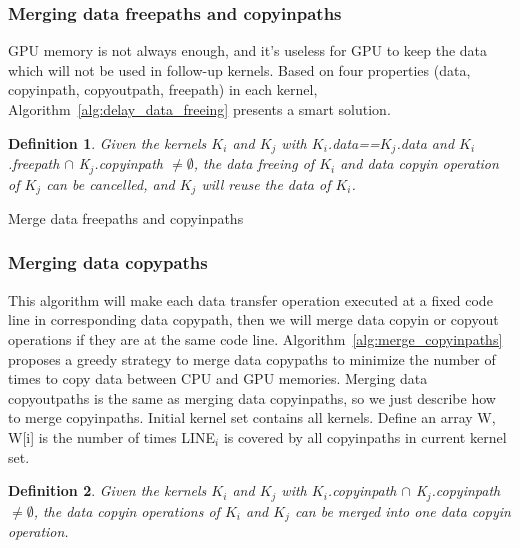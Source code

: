 \documentclass[10pt,conference]{IEEEtran}
\newtheorem{Def1}{Definition}
\begin{document}
\subsubsection{Merging data freepaths and copyinpaths}
GPU memory is not always enough, and it's useless for GPU to keep the data which will not be used in follow-up kernels. Based on four properties (data, copyinpath, copyoutpath, freepath) in each kernel, Algorithm~\ref{alg:delay_data_freeing} presents a smart solution.
\begin{Def1}
Given the kernels $K_i$ and $K_j$ with $K_i$.data==$K_j$.data and $K_i$.freepath $\cap$ K$_j$.copyinpath $\ne \emptyset$, the data freeing of $K_i$ and data copyin operation of $K_j$ can be cancelled, and $K_j$ will reuse the data of $K_i$.
\end{Def1}

\begin{algorithm}
\caption{Merge data freepaths and copyinpaths}
\label{alg:delay_data_freeing}
\end{algorithm}

\subsubsection{Merging data copypaths}
This algorithm will make each data transfer operation executed at a fixed code line in corresponding data copypath, then we will merge data copyin or copyout operations if they are at the same code line. Algorithm~\ref{alg:merge_copyinpaths} proposes a greedy strategy to merge data copypaths to minimize the number of times to copy data between CPU and GPU memories. Merging data copyoutpaths is the same as merging data copyinpaths, so we just describe how to merge copyinpaths. Initial kernel set contains all kernels. Define an array W, W[i] is the number of times LINE$_i$ is covered by all copyinpaths in current kernel set.
\begin{Def1}
Given the kernels $K_i$ and $K_j$ with $K_i$.copyinpath $\cap$ K$_j$.copyinpath $\ne \emptyset$, the data copyin operations of $K_i$ and $K_j$ can be merged into one data copyin operation.
\end{Def1}
\end{document}

